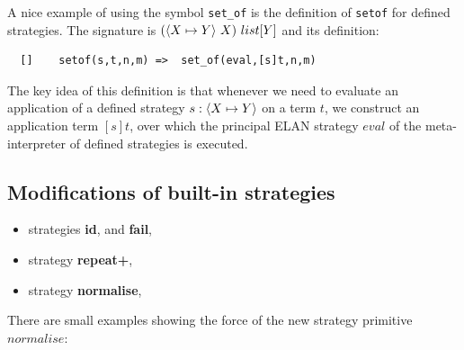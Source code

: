 \documentclass{article}
\begin{document}
A nice example of using the symbol \verb|set_of| is 
the definition of \verb|setof| for defined strategies.
The signature is $(\langle X \mapsto Y \rangle~X)~list[Y]$ and 
its definition:
{\small
\begin{verbatim}
  []    setof(s,t,n,m) =>  set_of(eval,[s]t,n,m) 
\end{verbatim}}
The key idea of this definition is that whenever
we need to evaluate an application
of a defined
strategy $s:\langle X \mapsto Y \rangle$ on a term $t$,
we construct an application term $[s]t$,
over which the principal ELAN strategy $eval$ of the
meta-interpreter of defined strategies is executed.

\subsection{Modifications of built-in strategies}

\begin{itemize}
  \item strategies {\bf id}, and {\bf fail},
  \item strategy {\bf repeat+},
  \item strategy {\bf normalise},
\end{itemize}

There are small examples showing the force of the new 
strategy primitive  $normalise$:
\end{document}
